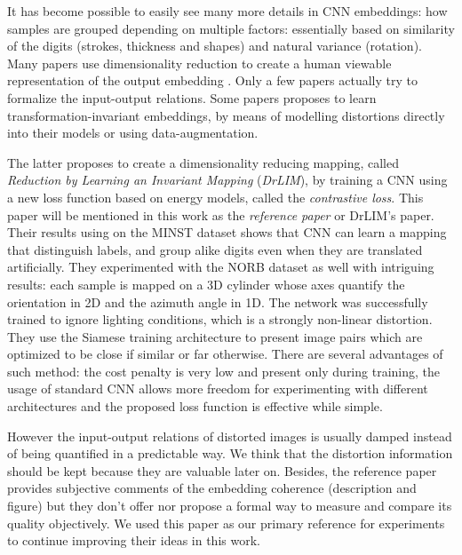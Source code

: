 \documentclass[a4paper,12pt]{report}
\begin{document}
It has become possible to easily see many more details in CNN embeddings: how samples are grouped depending on multiple factors: essentially based on similarity of the digits (strokes, thickness and shapes) and natural variance (rotation).
Many papers use dimensionality reduction to create a human viewable representation of the output embedding \cite{donahue2013decaf}\cite{yu2014visualizing}\cite{yaotiny}.
Only a few papers actually try to formalize the input-output relations\cite{goodfellow2009measuring}.
Some papers proposes to learn transformation-invariant embeddings, by means of modelling distortions directly into their models\cite{gens2014deep} or using data-augmentation\cite{hadsell2006dimensionality}.

The latter proposes to create a dimensionality reducing mapping, called {\em Reduction by Learning an Invariant Mapping} ({\em DrLIM}), by training a CNN using a new loss function based on energy models, called the {\em contrastive loss}.
This paper will be mentioned in this work as the {\em reference paper} or DrLIM's paper.
Their results using on the MINST dataset\cite{lecun1998mnist} shows that CNN can learn a mapping that distinguish labels, and group alike digits even when they are translated artificially.
They experimented with the NORB dataset\cite{lecun2004learning} as well with intriguing results: each sample is mapped on a 3D cylinder whose axes quantify the orientation in 2D and the azimuth angle in 1D.
The network was successfully trained to ignore lighting conditions, which is a strongly non-linear distortion.
They use the Siamese training architecture to present image pairs which are optimized to be close if similar or far otherwise\cite{bromley1993signature}\cite{chopra2005learning}.
There are several advantages of such method: the cost penalty is very low and present only during training, the usage of standard CNN allows more freedom for experimenting with different architectures and the proposed loss function is effective while simple.

However the input-output relations of distorted images is usually damped instead of being quantified in a predictable way.
We think that the distortion information should be kept because they are valuable later on.
Besides, the reference paper provides subjective comments of the embedding coherence (description and figure) but they don't offer nor propose a formal way to measure and compare its quality objectively.
We used this paper as our primary reference for experiments to continue improving their ideas in this work.
\end{document}
